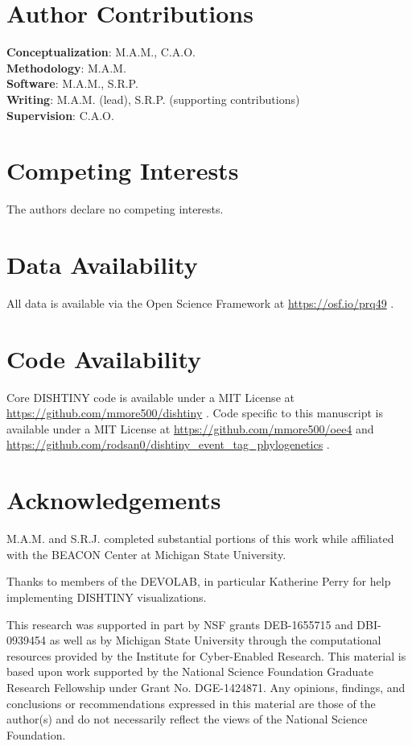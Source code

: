 \section*{Author Contributions}

\textbf{Conceptualization}: M.A.M., C.A.O. \\
\textbf{Methodology}: M.A.M. \\
\textbf{Software}: M.A.M., S.R.P. \\
\textbf{Writing}: M.A.M. (lead), S.R.P. (supporting contributions) \\
\textbf{Supervision}: C.A.O.

\section*{Competing Interests}

The authors declare no competing interests.

\section*{Data Availability}

All data is available via the Open Science Framework at \url{https://osf.io/prq49} \citep{Moreno_Rodriguez_Papa_2022}.

\section*{Code Availability}

Core DISHTINY code is available under a MIT License at \url{https://github.com/mmore500/dishtiny} \citep{moreno_2025_16990564}.
Code specific to this manuscript is available under a MIT License at \url{https://github.com/mmore500/oee4} and \url{https://github.com/rodsan0/dishtiny_event_tag_phylogenetics} \citep{matthew_andres_moreno_2024_16990558,rodsan0_2025_16990704}.

\section*{Acknowledgements}

M.A.M. and S.R.J. completed substantial portions of this work while affiliated with the BEACON Center at Michigan State University.

Thanks to members of the DEVOLAB, in particular Katherine Perry for help implementing DISHTINY visualizations.

This research was supported in part by NSF grants DEB-1655715 and DBI-0939454 as well as by Michigan State University through the computational resources provided by the Institute for Cyber-Enabled Research.
This material is based upon work supported by the National Science Foundation Graduate Research Fellowship under Grant No. DGE-1424871.
Any opinions, findings, and conclusions or recommendations expressed in this material are those of the author(s) and do not necessarily reflect the views of the National Science Foundation.

